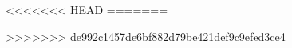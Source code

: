 
\newcommand{\kLanguage}{eng}

\newcommand{\kLoesungen}{false}

\newcommand{\kAufgabenNiveau}{auchTraining}

\newcommand{\kMMPapier}{false}

\newcommand{\kVersion}{V0.0.1 Nov. 2023}

<<<<<<< HEAD
=======


>>>>>>> de992c1457de6bf882d79be421def9c9efed3ce4
\newcommand{\kDraftKommentare}{true}


